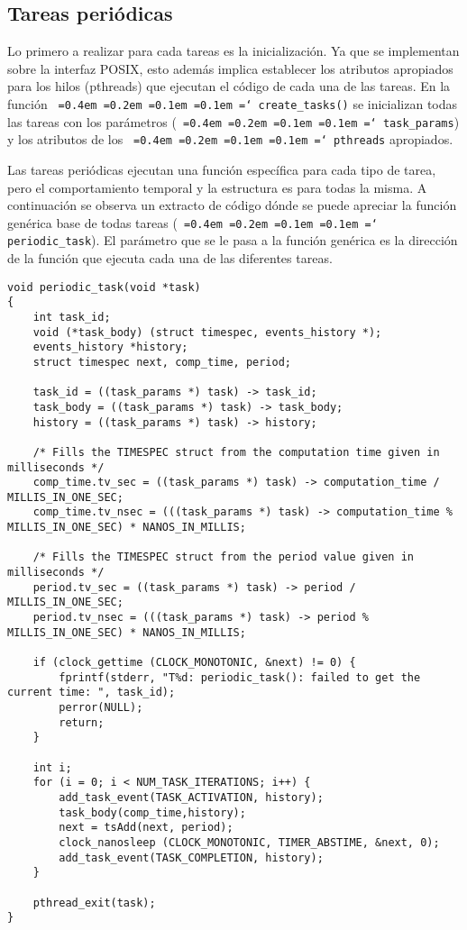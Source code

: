\documentclass[11pt,spanish]{article}
\newcommand*\justify{%
  \fontdimen2\font=0.4em%
  \fontdimen3\font=0.2em%
  \fontdimen4\font=0.1em%
  \fontdimen7\font=0.1em%
  \hyphenchar\font=`\-%
}
\newcommand{\code}[1]{\texttt{\justify #1}}
\begin{document}
\subsection{Tareas periódicas}
Lo primero a realizar para cada tareas es la inicialización. Ya que se implementan
sobre la interfaz POSIX, esto además implica establecer los atributos apropiados para los
hilos (pthreads) que ejecutan el código de cada una de las tareas. En la función
\code{create\_tasks()} se inicializan todas las tareas con los parámetros (\code{task\_params})
y los atributos de los \code{pthreads} apropiados.

Las tareas periódicas ejecutan una función específica para cada tipo de tarea, pero 
el comportamiento temporal y la estructura es para todas la misma. A continuación se 
observa un extracto de código dónde se puede apreciar la función genérica base de 
todas tareas (\code{periodic\_task}). El parámetro que se le pasa a la función genérica
es la dirección de la función que ejecuta cada una de las diferentes tareas.

\begin{lstlisting}[style=c]
void periodic_task(void *task)
{
    int task_id;
    void (*task_body) (struct timespec, events_history *);
    events_history *history;
    struct timespec next, comp_time, period;
    
    task_id = ((task_params *) task) -> task_id;
    task_body = ((task_params *) task) -> task_body;
    history = ((task_params *) task) -> history;

    /* Fills the TIMESPEC struct from the computation time given in milliseconds */ 
    comp_time.tv_sec = ((task_params *) task) -> computation_time / MILLIS_IN_ONE_SEC;
    comp_time.tv_nsec = (((task_params *) task) -> computation_time % MILLIS_IN_ONE_SEC) * NANOS_IN_MILLIS;

    /* Fills the TIMESPEC struct from the period value given in milliseconds */ 
    period.tv_sec = ((task_params *) task) -> period / MILLIS_IN_ONE_SEC;
    period.tv_nsec = (((task_params *) task) -> period % MILLIS_IN_ONE_SEC) * NANOS_IN_MILLIS;

    if (clock_gettime (CLOCK_MONOTONIC, &next) != 0) {
        fprintf(stderr, "T%d: periodic_task(): failed to get the current time: ", task_id);
        perror(NULL);
        return;
    }

    int i;
    for (i = 0; i < NUM_TASK_ITERATIONS; i++) {
        add_task_event(TASK_ACTIVATION, history);
        task_body(comp_time,history);
        next = tsAdd(next, period);
        clock_nanosleep (CLOCK_MONOTONIC, TIMER_ABSTIME, &next, 0);
        add_task_event(TASK_COMPLETION, history);
    }

    pthread_exit(task);
}
\end{lstlisting}
\end{document}
